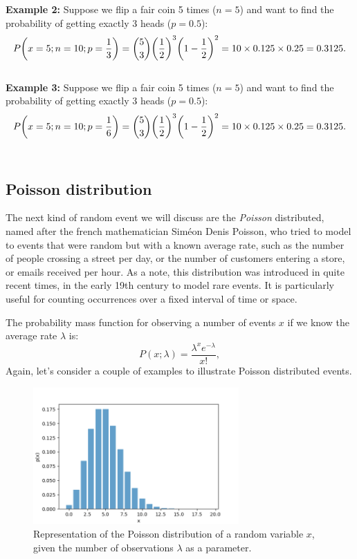 \documentclass{book}
\begin{document}
\textbf{Example 2:} Suppose we flip a fair coin 5 times ($n=5$) and want to find the probability of getting exactly 3 heads ($p=0.5$):
\begin{equation}
    P\bigg(x=5; n = 10; p = \frac{1}{3}\bigg) = \binom{5}{3} \bigg(\frac{1}{2}\bigg)^3 \bigg(1 - \frac{1}{2}\bigg)^2 = 10 \times 0.125 \times 0.25 = 0.3125. \notag
\end{equation}\\

\textbf{Example 3:} Suppose we flip a fair coin 5 times ($n=5$) and want to find the probability of getting exactly 3 heads ($p=0.5$):
\begin{equation}
    P\bigg(x=5; n = 10; p = \frac{1}{6}\bigg) = \binom{5}{3} \bigg(\frac{1}{2}\bigg)^3 \bigg(1 - \frac{1}{2}\bigg)^2 = 10 \times 0.125 \times 0.25 = 0.3125. \notag
\end{equation}\\

\newpage
\subsection{Poisson distribution}
The next kind of random event we will discuss are the \textit{Poisson} distributed, named after the french mathematician Sim\'eon Denis Poisson, who tried to model to events that were random but with a known average rate, such as the number of people crossing a street per day, or the number of customers entering a store, or emails received per hour.
As a note, this distribution was introduced in quite recent times, in the early 19th century to model rare events. It is particularly useful for counting occurrences over a fixed interval of time or space. 

The probability mass function for observing a number of events $x$ if we know the average rate $\lambda$ is:
\begin{equation}
    P(x; \lambda) = \frac{\lambda^x e^{-\lambda}}{x!},
\end{equation}
Again, let's consider a couple of examples to illustrate Poisson distributed events.

\begin{figure}[ht]
    \centering
    \includegraphics[width=0.7\textwidth]{figures/chapter2/poisson.png}
    \caption{Representation of the Poisson distribution of a random variable $x$, given the number of observations $\lambda$ as a parameter.}
    \label{fig:random}
\end{figure}
\end{document}
